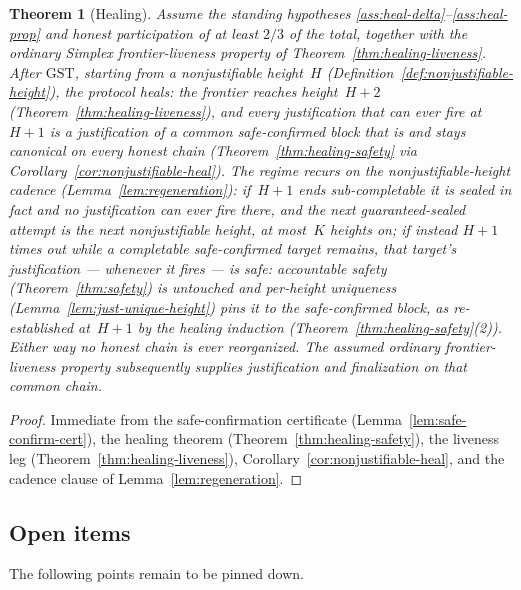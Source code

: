 \ifx\litemode\undefined\documentclass{article}\fi
\newcommand{\GST}{\ensuremath{\mathrm{GST}}\xspace}
\newcommand{\Knj}{\ensuremath{K}}                      %
\theoremstyle{plain}
\newtheorem{theorem}{Theorem}
\theoremstyle{definition}
\theoremstyle{remark}
\begin{document}
\begin{theorem}[Healing]\label{thm:healing-main}
Assume the standing hypotheses \ref{ass:heal-delta}--\ref{ass:heal-prop} and
honest participation of at least \(2/3\) of the total, together with the
ordinary Simplex frontier-liveness property of
Theorem~\ref{thm:healing-liveness}.  After \GST, starting from a nonjustifiable
height~\(H\) (Definition~\ref{def:nonjustifiable-height}), the protocol heals:
the frontier reaches height~\(H+2\)
(Theorem~\ref{thm:healing-liveness}), and every justification that can ever fire
at~\(H+1\) is a justification of a common safe-confirmed block that is and stays
canonical on every honest chain (Theorem~\ref{thm:healing-safety} via
Corollary~\ref{cor:nonjustifiable-heal}).  The regime recurs on the
nonjustifiable-height cadence (Lemma~\ref{lem:regeneration}): if~\(H+1\) ends
sub-completable it is sealed \emph{in fact} and no justification can ever fire
there, and the next guaranteed-sealed attempt is the next nonjustifiable height,
at most~\(\Knj\) heights on; if instead \(H+1\) times out while a completable
safe-confirmed target remains, that target's justification --- whenever it fires
--- is safe: accountable safety (Theorem~\ref{thm:safety}) is untouched and
per-height uniqueness (Lemma~\ref{lem:just-unique-height}) pins it to the
safe-confirmed block, as re-established at~\(H+1\) by the healing induction
(Theorem~\ref{thm:healing-safety}(2)).  Either way no honest chain is ever
reorganized.  The assumed ordinary frontier-liveness property subsequently
supplies justification and finalization on that common chain.
\end{theorem}

\begin{proof}
Immediate from the safe-confirmation certificate
(Lemma~\ref{lem:safe-confirm-cert}), the healing theorem
(Theorem~\ref{thm:healing-safety}), the liveness leg
(Theorem~\ref{thm:healing-liveness}), Corollary~\ref{cor:nonjustifiable-heal}, and
the cadence clause of Lemma~\ref{lem:regeneration}.
\end{proof}

\subsection{Open items}\label{sec:open-items}

The following points remain to be pinned down.
\end{document}
